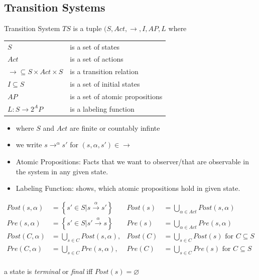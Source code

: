 \documentclass[a4paper, 10pt]{article}
\begin{document}
\subsection*{Transition Systems}
\begin{shaded}
Transition System $TS$ is a tuple $(S,Act,\to,I,AP,L$ where \\
\begin{minipage}{0.48\textwidth}
\begin{tabular}{ll}
$S$ & is a set of states \\
$Act$ & is a set of actions \\
$\to\subseteq S\times Act\times S$ & is a transition relation \\
$I\subseteq S$ & is a set of initial states \\
$AP$ & is a set of atomic propositions \\
$L:S\to2^AP$ & is a labeling function \\
\end{tabular}
\end{minipage}
\hfill \vrule \hfill
\begin{minipage}{0.48\textwidth}
\begin{itemize}
    \item where $S$ and $Act$ are finite or countably infinte
    \item we write $s\to^\alpha s'$ for $\left(s,\alpha,s'\right)\in\to$
    \item Atomic Propositions: Facts that we want to observer/that are observable in the system in any given state.
    \item Labeling Function: shows, which atomic propositions hold in given state.
\end{itemize}
\end{minipage}
\end{shaded}

\begin{shaded}
    \begin{align*}
        Post(s,\alpha) &= \left\{ s'\in S | s\overset{\alpha}{\longrightarrow} s' \right\}
        & Post(s)&=\bigcup_{\alpha\in Act} Post(s,\alpha)
        \\
        Pre(s,\alpha) &= \left\{ s'\in S | s'\overset{\alpha}{\longrightarrow} s \right\}
        & Pre(s)&=\bigcup_{\alpha\in Act} Pre(s,\alpha)
        \\
        Post(C,\alpha) &= \bigcup_{s\in C} Post(s,\alpha),
        & Post(C) &= \bigcup_{s\in C} Post(s)\textrm{ for } C\subseteq S
        \\
        Pre(C,\alpha) &= \bigcup_{s\in C} Pre(s,\alpha),
        & Pre(C) &= \bigcup_{s\in C} Pre(s)\textrm{ for } C\subseteq S
        \\
    \end{align*}
    \begin{center}
    a state is \emph{terminal} or \emph{final} iff $Post(s)=\varnothing$
    \end{center}
\end{shaded}
\end{document}
